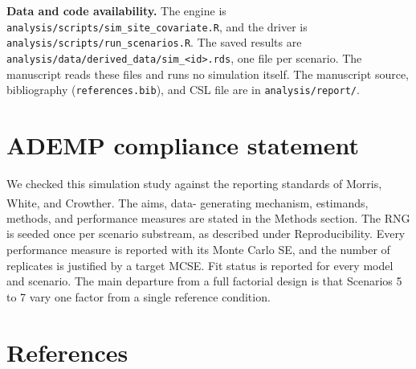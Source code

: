 \documentclass[
  11pt,
]{article}
\begin{document}
\textbf{Data and code availability.} The engine is
\texttt{analysis/scripts/sim\_site\_covariate.R}, and the driver is
\texttt{analysis/scripts/run\_scenarios.R}. The saved results are
\texttt{analysis/data/derived\_data/sim\_\textless{}id\textgreater{}.rds}, one file per scenario.
The manuscript reads these files and runs no simulation itself. The
manuscript source, bibliography (\texttt{references.bib}), and CSL file
are in \texttt{analysis/report/}.

\section{ADEMP compliance statement}\label{ademp-compliance-statement}

We checked this simulation study against the reporting standards
of Morris, White, and Crowther\textsuperscript{}. The aims, data-
generating mechanism, estimands, methods, and performance measures
are stated in the Methods section. The RNG is seeded once per
scenario substream, as described under Reproducibility. Every
performance measure is reported with its Monte Carlo SE, and the
number of replicates is justified by a target MCSE. Fit status is
reported for every model and scenario. The main departure from a
full factorial design is that Scenarios 5 to 7 vary one factor
from a single reference condition.

\section{References}\label{references}
\end{document}
